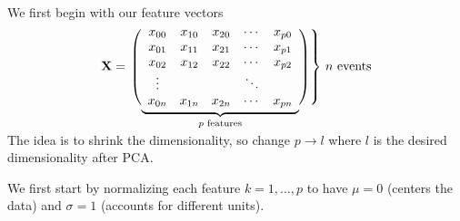 We first begin with our feature vectors
$$\mathbf{X} = \left.\left( 
                  \vphantom{\begin{array}{c}1\\1\\1\\1\\1\end{array}}
                  \smash{\underbrace{
                      \begin{array}{ccccc}
                             x_{00}&x_{10}&x_{20}&\cdots &x_{p0}\\
                             x_{01}&x_{11}&x_{21}&\cdots &x_{p1}\\
                             x_{02}&x_{12}&x_{22}&\cdots &x_{p2}\\
                             \vdots&&&\ddots&\\
                             x_{0n}&x_{1n}&x_{2n}&\cdots &x_{pn}
                      \end{array}
                      }_{p\text{ features}}}
              \right)\right\}
              \,n\text{ events}
$$\\

The idea is to shrink the dimensionality, so change $p\rightarrow l$ where $l$ is the desired dimensionality after PCA. 

We first start by normalizing each feature $k=1,\dots,p$ to have $\mu=0$ (centers the data) and $\sigma=1$ (accounts for different units).

